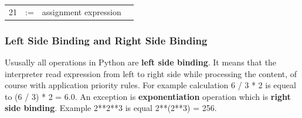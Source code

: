 \documentclass{article}
\begin{document}
\begin{table}[htb]
{\begin{tabular}{c l l l}
21 & :=                                                                                                            & assignment expression                                                                                                                &                                                                                                                                                                                                                                                                                                                                                                                                                                                                                                                                                                                                                               
\end{tabular}
}
\end{table}

\FloatBarrier	%

	\subsubsection{Left Side Binding and Right Side Binding}
	Ususally all operations in Python are \textbf{left side binding}. It means that the interpreter read expression from left to right side while processing the content, of course with application priority rules. For example calculation 6 / 3 * 2 is equeal to (6 / 3) * 2 = 6.0. An exception is \textbf{exponentiation} operation which is \textbf{right side binding}. Example 2**2**3 is equal 2**(2**3) = 256.
	
	\newpage
\end{document}
